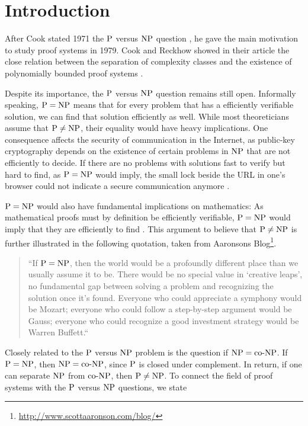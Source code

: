 \chapter{Introduction}
  After Cook stated 1971 the \(\P\) versus \(\NP\) question \cite{C71}, he gave the main motivation to study proof systems in 1979. Cook and Reckhow showed in their article the close relation between the separation of complexity classes and the existence of polynomially bounded proof systems \cite{CR79}.

  Despite its importance, the \(\P\) versus \(\NP\) question remains still open. Informally speaking, \(\P = \NP\) means that for every problem that has a efficiently verifiable solution, we can find that solution efficiently as well. While most theoreticians assume that \(\P \neq \NP\), their equality would have heavy implications. One consequence affects the security of communication in the Internet, as public-key cryptography depends on the existence of certain problems in \(\NP\) that are not efficiently to decide. If there are no problems with solutions fast to verify but hard to find, as \(\P = \NP\) would imply, the small lock beside the URL in one's browser could not indicate a secure communication anymore \cite{F09}.

  \(\P = \NP\) would also have fundamental implications on mathematics: As mathematical proofs must by definition be efficiently verifiable, \(\P = \NP\) would imply that they are efficiently to find \cite{CR79}. This argument to believe that \(\P \neq \NP\) is further illustrated in the following quotation, taken from Aaronsons Blog\footnote{\url{http://www.scottaaronson.com/blog/}}.

  \begin{quotation}
    ``If \(\P=\NP\), then the world would be a profoundly different place than we usually assume it to be. There would be no special value in `creative leaps', no fundamental gap between solving a problem and recognizing the solution once it's found. Everyone who could appreciate a symphony would be Mozart; everyone who could follow a step-by-step argument would be Gauss; everyone who could recognize a good investment strategy would be Warren Buffett.``
  \end{quotation}

  Closely related to the \(\P\) versus \(\NP\) problem is the question if \(\NP = \coNP\). If \(\P = \NP\), then \(\NP = \coNP\), since \(\P\) is closed under complement. In return, if one can separate \(\NP\) from \(\coNP\), then \(\P \neq \NP\). To connect the field of proof systems with the \(\P\) versus \(\NP\) questions, we state

